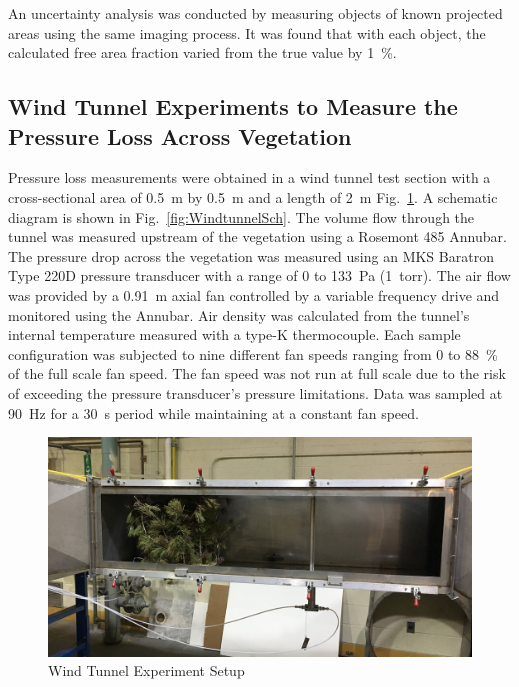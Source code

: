 \documentclass[12pt]{article}
\begin{document}
An uncertainty analysis was conducted by measuring objects of known projected areas using the same imaging process. It was found that with each object, the calculated free area fraction varied from the true value by 1~\%.

\subsection{Wind Tunnel Experiments to Measure the Pressure Loss Across Vegetation}
\label{ssec:headingscap}

Pressure loss measurements were obtained in a wind tunnel test section with a cross-sectional area of 0.5~\si{m} by 0.5~\si{m} and a length of 2~\si{m} Fig.~\ref{fig:WindtunnelPic}. A schematic diagram is shown in Fig.~\ref{fig:WindtunnelSch}. The volume flow through the tunnel was measured upstream of the vegetation using a Rosemont 485 Annubar. The pressure drop across the vegetation was measured using an MKS Baratron Type 220D pressure transducer with a range of 0 to 133~Pa (1~torr). The air flow was provided by a 0.91~m axial fan controlled by a variable frequency drive and monitored using the Annubar. Air density was calculated from the tunnel's internal temperature measured with a type-K thermocouple. Each sample configuration was subjected to nine different fan speeds ranging from 0 to 88~\% of the full scale fan speed. The fan speed was not run at full scale due to the risk of exceeding the pressure transducer's pressure limitations. Data was sampled at 90~\si{Hz} for a 30~\si{s} period while maintaining at a constant fan speed.

\begin{figure} [!ht]
	\centering 	\includegraphics[width=1.0\linewidth]{Picture4.jpg}
	\caption{Wind Tunnel Experiment Setup}
	\label{fig:WindtunnelPic}
\end{figure}
\end{document}
